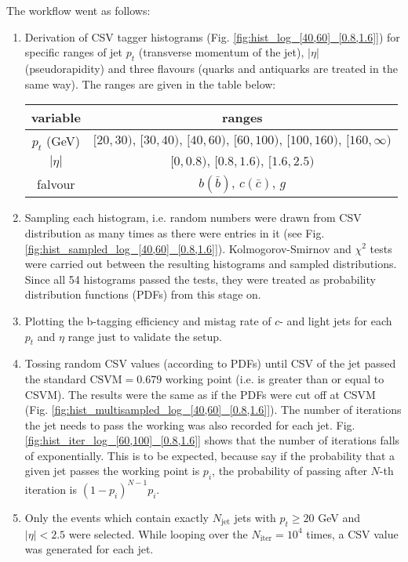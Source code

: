 \documentclass[12pt,a4paper]{article}
\begin{document}
\noindent The workflow went as follows:
\begin{enumerate}
\item Derivation of CSV tagger histograms (Fig. \ref{fig:hist_log_[40,60]_[0.8,1.6]}) for specific ranges of jet $p_t$ (transverse momentum of the jet), $|\eta|$ (pseudorapidity) and three flavours (quarks and antiquarks are treated in the same way).
The ranges are given in the table below:
\begin{center}
	\begin{tabular}{ c | c }
		\hline
		variable & ranges \\ \hline
		$p_t$ (GeV) & $[20,30),\,[30,40),\,[40,60),\,[60,100),\,[100,160),\,[160,\infty)$ \\ \hline
		$|\eta|$ & $[0,0.8),\,[0.8,1.6),\,[1.6,2.5)$ \\ \hline
		falvour & $b(\bar{b})$, $c(\bar{c})$, $g$ \\
	\end{tabular}
\end{center}
\item Sampling each histogram, i.e. random numbers were drawn from CSV distribution as many times as there were entries in it (see Fig. \ref{fig:hist_sampled_log_[40,60]_[0.8,1.6]}).
Kolmogorov-Smirnov and $\chi^2$ tests were carried out between the resulting histograms and sampled distributions.
Since all 54 histograms passed the tests, they were treated as probability distribution functions (PDFs) from this stage on.
\item Plotting the b-tagging efficiency and mistag rate of $c$- and light jets for each $p_t$ and $\eta$ range just to validate the setup.
\item Tossing random CSV values (according to PDFs) until CSV of the jet passed the standard $\mbox{CSVM}=0.679$ working point (i.e. is greater than or equal to CSVM).
The results were the same as if the PDFs were cut off at CSVM (Fig. \ref{fig:hist_multisampled_log_[40,60]_[0.8,1.6]}).
The number of iterations the jet needs to pass the working was also recorded for each jet.
Fig. \ref{fig:hist_iter_log_[60,100]_[0.8,1.6]} shows that the number of iterations falls of exponentially.
This is to be expected, because say if the probability that a given jet passes the working point is $p_i$, the probability of passing after $N$-th iteration is $(1-p_i)^{N-1}p_i$.
\item Only the events which contain exactly $N_{\text{jet}}$ jets with $p_t \geq 20$ GeV and $|\eta| < 2.5$ were selected.
While looping over the $N_{\text{iter}} = 10^4$ times, a CSV value was generated for each jet.

\end{enumerate}
\end{document}
